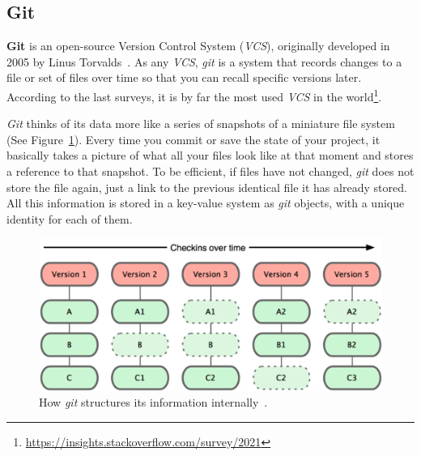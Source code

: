 \documentclass[a4paper, 12pt]{book}
\begin{document}
\subsection{Git}
\label{ssec:git}

\textbf{Git} is an open-source Version Control System (\emph{VCS}), originally developed in 2005 by Linus Torvalds~\cite{somasundaram2013git}.
As any \emph{VCS}, \emph{git} is a system that records changes to a file or set of files over time
so that you can recall specific versions later. According to the last surveys, it is by far the most used \emph{VCS} in the
world\footnote{\url{https://insights.stackoverflow.com/survey/2021}}.

\emph{Git} thinks of its data more like a series of snapshots of a miniature file system (See Figure~\ref{fig:info-git}).
Every time you commit or save the state of your project, it basically takes a picture of what all
your files look like at that moment and stores a reference to that snapshot. To be efficient, if files have not changed,
\emph{git} does not store the file again, just a link to the previous identical file it has already stored.
All this information is stored in a key-value system as \emph{git} objects, with a unique identity for each of them.

\begin{figure}
  \centering
  \includegraphics[width=12cm, keepaspectratio]{img/snapshots-git}
  \caption{How \emph{git} structures its information internally~\cite{progit2014book}.}
  \label{fig:info-git}
\end{figure}


\end{document}
